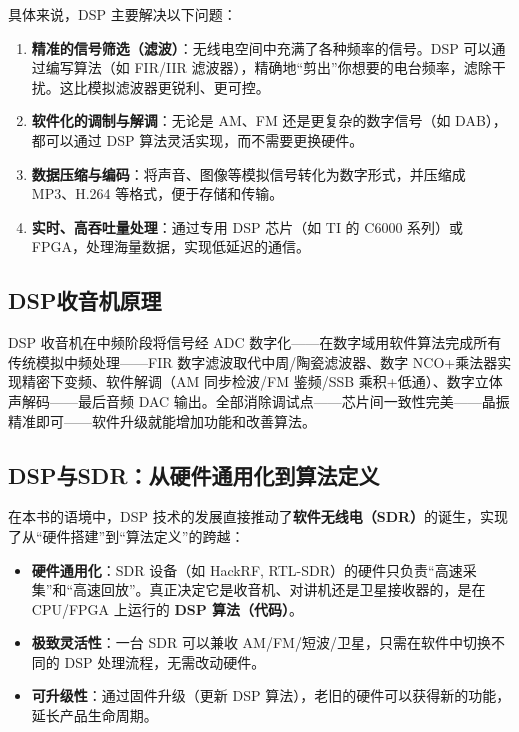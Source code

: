 \documentclass[12pt,UTF8]{ctexbook}
\begin{document}
具体来说，DSP 主要解决以下问题：
\begin{enumerate}[leftmargin=2cm]
    \item \textbf{精准的信号筛选（滤波）}：无线电空间中充满了各种频率的信号。DSP 可以通过编写算法（如 FIR/IIR 滤波器），精确地“剪出”你想要的电台频率，滤除干扰。这比模拟滤波器更锐利、更可控。
    \item \textbf{软件化的调制与解调}：无论是 AM、FM 还是更复杂的数字信号（如 DAB），都可以通过 DSP 算法灵活实现，而不需要更换硬件。
    \item \textbf{数据压缩与编码}：将声音、图像等模拟信号转化为数字形式，并压缩成 MP3、H.264 等格式，便于存储和传输。
    \item \textbf{实时、高吞吐量处理}：通过专用 DSP 芯片（如 TI 的 C6000 系列）或 FPGA，处理海量数据，实现低延迟的通信。
\end{enumerate}

\subsection{DSP收音机原理}

DSP 收音机在中频阶段将信号经 ADC 数字化——在数字域用软件算法完成所有传统模拟中频处理——FIR 数字滤波取代中周/陶瓷滤波器、数字 NCO+乘法器实现精密下变频、软件解调（AM 同步检波/FM 鉴频/SSB 乘积+低通）、数字立体声解码——最后音频 DAC 输出。全部消除调试点——芯片间一致性完美——晶振精准即可——软件升级就能增加功能和改善算法。

\subsection{DSP与SDR：从硬件通用化到算法定义}

在本书的语境中，DSP 技术的发展直接推动了\textbf{软件无线电（SDR）}的诞生，实现了从“硬件搭建”到“算法定义”的跨越：

\begin{itemize}[leftmargin=2cm]
    \item \textbf{硬件通用化}：SDR 设备（如 HackRF, RTL-SDR）的硬件只负责“高速采集”和“高速回放”。真正决定它是收音机、对讲机还是卫星接收器的，是在 CPU/FPGA 上运行的 \textbf{DSP 算法（代码）}。
    \item \textbf{极致灵活性}：一台 SDR 可以兼收 AM/FM/短波/卫星，只需在软件中切换不同的 DSP 处理流程，无需改动硬件。
    \item \textbf{可升级性}：通过固件升级（更新 DSP 算法），老旧的硬件可以获得新的功能，延长产品生命周期。
\end{itemize}
\end{document}
